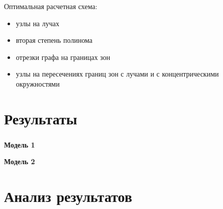 \begin{frame}
\frametitle{\insertsection}

Оптимальная расчетная схема:
\begin{itemize}
    \item узлы на лучах
    \item вторая степень полинома
    \item отрезки графа на границах зон
    \item узлы на пересечениях границ зон с лучами и с концентрическими окружностями
\end{itemize}

\begin{minipage}[t]{0.47\linewidth}
\end{minipage}
\hfill
\begin{minipage}[t]{0.47\linewidth}
\end{minipage}
\end{frame}


\section{Результаты}

\begin{frame}
\frametitle{\insertsection}

\vspace{-0.5cm}
\begin{minipage}[t]{0.47\linewidth}
    \textbf{Модель 1}
\end{minipage}
\hfill
\begin{minipage}[t]{0.47\linewidth}
    \textbf{Модель 2}
\end{minipage}

\end{frame}


\section{Анализ результатов}

